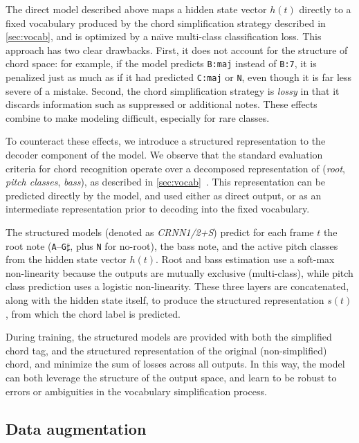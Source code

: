 \documentclass{article}
\begin{document}
The direct model described above maps a hidden state vector $h(t)$ directly to a fixed vocabulary produced by the chord simplification strategy described in \cref{sec:vocab}, and is optimized by a na\"{\i}ve multi-class classification loss.
This approach has two clear drawbacks.
First, it does not account for the structure of chord space: for example, if the model predicts \texttt{B:maj} instead of \texttt{B:7}, it is penalized just as much as if it had predicted \texttt{C:maj} or \texttt{N}, even though it is far less severe of a mistake.
Second, the chord simplification strategy is \emph{lossy} in that it discards information such as suppressed or additional notes.
These effects combine to make modeling difficult, especially for rare classes.

To counteract these effects, we introduce a structured representation to the decoder component of the model.
We observe that the standard evaluation criteria for chord recognition operate over a decomposed representation of (\emph{root}, \emph{pitch classes}, \emph{bass}), as described in \cref{sec:vocab}~\cite{raffel2014mir_eval}.
This representation can be predicted directly by the model, and used either as direct output, or as an intermediate representation prior to decoding into the fixed vocabulary.

The structured models (denoted as \emph{CRNN1/2+S}) predict for each frame $t$ the root note (\texttt{A}--\texttt{G}$\sharp$, plus \texttt{N} for no-root), the bass note, and the active pitch classes from the hidden state vector $h(t)$.
Root and bass estimation use a soft-max non-linearity because the outputs are mutually exclusive (multi-class), while pitch class prediction uses a logistic non-linearity.
These three layers are concatenated, along with the hidden state itself, to produce the structured representation $s(t)$, from which the chord label is predicted.

During training, the structured models are provided with both the simplified chord tag, and the structured representation of the original (non-simplified) chord, and minimize the sum of losses across all outputs.
In this way, the model can both leverage the structure of the output space, and learn to be robust to errors or ambiguities in the vocabulary simplification process.


\subsection{Data augmentation}
\end{document}
